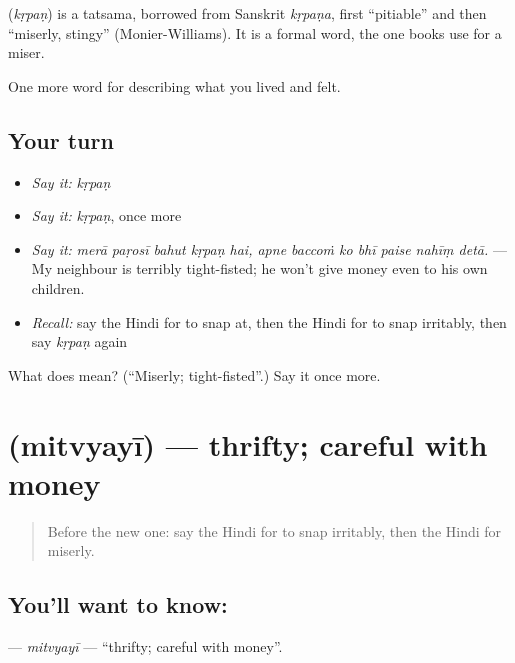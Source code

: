 \begin{cousinweb}
\textbf{} (\emph{kṛpaṇ}) is a tatsama, borrowed from Sanskrit \emph{kṛpaṇa}, first \textquotedblleft{}pitiable\textquotedblright{} and then \textquotedblleft{}miserly, stingy\textquotedblright{} (Monier-Williams). It is a formal word, the one books use for a miser.
\end{cousinweb}

\begin{grammarlens}[title={What you've built}]
One more word for describing what you lived and felt.
\end{grammarlens}

\subsection*{Your turn}
\begin{itemize}
\raggedright
  \item \emph{Say it:} \emph{kṛpaṇ}
  \item \emph{Say it:} \emph{kṛpaṇ}, once more
  \item \emph{Say it:} \emph{merā paṛosī bahut kṛpaṇ hai, apne baccoṁ ko bhī paise nahīṃ detā.} — My neighbour is terribly tight-fisted; he won't give money even to his own children.
  \item \emph{Recall:} say the Hindi for to snap at, then the Hindi for to snap irritably, then say \emph{kṛpaṇ} again
\end{itemize}

\begin{tcolorbox}[breakable,colback=teal!4,colframe=teal!35!black,title={Before you move on}]
What does  mean? (\textquotedblleft{}Miserly; tight-fisted\textquotedblright{}.) Say it once more.
\end{tcolorbox}
\section[\texorpdfstring{\hi{मितव्ययी} (mitvyayī)}{मितव्ययी (mitvyayī)}]{ (mitvyayī) — thrifty; careful with money}

\label{lesson:HI-C469-mitvyayi}



\begin{quote}
Before the new one: say the Hindi for to snap irritably, then the Hindi for miserly.
\end{quote}

\subsection*{You'll want to know: }
\textbf{} — \emph{mitvyayī} — \textquotedblleft{}thrifty; careful with money\textquotedblright{}.

